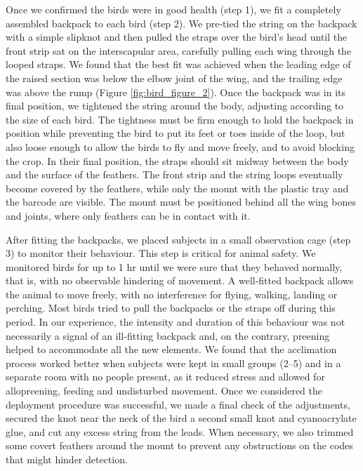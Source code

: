 \documentclass[11pt,a4paper,twoside]{book}
\begin{document}
\begin{doublespace}
Once we confirmed the birds were in good health (step 1), we fit a completely assembled backpack to each bird (step 2). We pre‐tied the string on the backpack with a simple slipknot and then pulled the straps over the bird's head until the front strip sat on the interscapular area, carefully pulling each wing through the looped straps. We found that the best fit was achieved when the leading edge of the raised section was below the elbow joint of the wing, and the trailing edge was above the rump (Figure \ref{fig:bird_figure_2}). Once the backpack was in its final position, we tightened the string around the body, adjusting according to the size of each bird. The tightness must be firm enough to hold the backpack in position while preventing the bird to put its feet or toes inside of the loop, but also loose enough to allow the birds to fly and move freely, and to avoid blocking the crop. In their final position, the straps should sit midway between the body and the surface of the feathers. The front strip and the string loops eventually become covered by the feathers, while only the mount with the plastic tray and the barcode are visible. The mount must be positioned behind all the wing bones and joints, where only feathers can be in contact with it.

After fitting the backpacks, we placed subjects in a small observation cage (step 3) to monitor their behaviour. This step is critical for animal safety. We monitored birds for up to 1 hr until we were sure that they behaved normally, that is, with no observable hindering of movement. A well‐fitted backpack allows the animal to move freely, with no interference for flying, walking, landing or perching. Most birds tried to pull the backpacks or the straps off during this period. In our experience, the intensity and duration of this behaviour was not necessarily a signal of an ill‐fitting backpack and, on the contrary, preening helped to accommodate all the new elements. We found that the acclimation process worked better when subjects were kept in small groups (2–5) and in a separate room with no people present, as it reduced stress and allowed for allopreening, feeding and undisturbed movement. Once we considered the deployment procedure was successful, we made a final check of the adjustments, secured the knot near the neck of the bird a second small knot and cyanoacrylate glue, and cut any excess string from the leads. When necessary, we also trimmed some covert feathers around the mount to prevent any obstructions on the codes that might hinder detection.


\end{doublespace}
\end{document}
